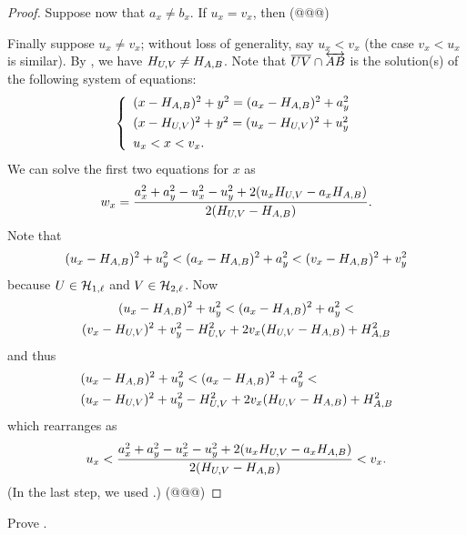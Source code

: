 \begin{proof}
Suppose now that \(a_x \neq b_x\).
If \(u_x = v_x\), then (@@@)

Finally suppose \(u_x \neq v_x\); without loss of generality, say \(u_x < v_x\) (the case \(v_x < u_x\) is similar).
By , we have \(H_{U,V} \neq H_{A,B}\).
Note that \(\overline{UV} \cap \overleftrightarrow{AB}\) is the solution(s) of the following system of equations: \[ \left\{ \begin{array}{l} (x - H_{A,B})^2 + y^2 = (a_x - H_{A,B})^2 + a_y^2 \\[4pt] (x - H_{U,V})^2 + y^2 = (u_x - H_{U,V})^2 + u_y^2 \\[4pt] u_x < x < v_x. \end{array} \right. \]
We can solve the first two equations for \(x\) as \[ w_x = \frac{a_x^2 + a_y^2 - u_x^2 - u_y^2 + 2(u_xH_{U,V} - a_xH_{A,B})}{2(H_{U,V} - H_{A,B})}. \]
Note that \[ (u_x - H_{A,B})^2 + u_y^2 < (a_x - H_{A,B})^2 + a_y^2 < (v_x - H_{A,B})^2 + v_y^2 \] because \(U \in \mathcal{H}_{1,\ell}\) and \(V \in \mathcal{H}_{2,\ell}\).
Now
\begin{multline*}
(u_x - H_{A,B})^2 + u_y^2 < (a_x - H_{A,B})^2 + a_y^2 < \\
  (v_x - H_{U,V})^2 + v_y^2 - H_{U,V}^2 + 2v_x(H_{U,V} - H_{A,B}) + H_{A,B}^2
\end{multline*}
and thus
\begin{multline*}
(u_x - \HHPIDEALPOINT{A}{B})^2 + u_y^2 < (a_x - \HHPIDEALPOINT{A}{B})^2 + a_y^2 < \hfill \\
  (u_x - \HHPIDEALPOINT{U}{V})^2 + u_y^2 - \HHPIDEALPOINT{U}{V}^2 + 2v_x(\HHPIDEALPOINT{U}{V} - \HHPIDEALPOINT{A}{B}) + \HHPIDEALPOINT{A}{B}^2
\end{multline*}
which rearranges as \[ u_x < \frac{a_x^2 + a_y^2 - u_x^2 - u_y^2 + 2(u_xH_{U,V} - a_xH_{A,B})}{2(H_{U,V} - H_{A,B})} < v_x. \] (In the last step, we used .)
(@@@)
\end{proof}



\Exercises%

\begin{exercise}
Prove .
\end{exercise}


